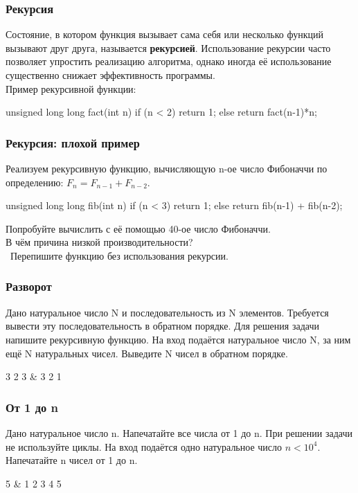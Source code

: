 \begin{frame}[fragile]
	\frametitle{Рекурсия}
	Состояние, в котором функция вызывает сама себя или несколько функций вызывают
	друг друга, называется {\bf рекурсией}. Использование рекурсии часто позволяет
	упростить реализацию алгоритма, однако иногда её использование существенно
	снижает эффективность программы. \\

	Пример рекурсивной функции:
	\begin{code}
unsigned long long fact(int n)
{
	if (n < 2)
		return 1;
	else
		return fact(n-1)*n;
}
	\end{code}
\end{frame}

\begin{frame}[fragile]
	\frametitle{Рекурсия: плохой пример}
	Реализуем рекурсивную функцию, вычисляющую n-ое число Фибоначчи по
	определению: $F_n = F_{n-1} + F_{n-2}$.

	\begin{code}
unsigned long long fib(int n)
{
	if (n < 3)
		return 1;
	else
		return fib(n-1) + fib(n-2);
}
	\end{code}
	Попробуйте вычислить с её помощью 40-ое число Фибоначчи. \\
	В чём причина низкой производительности? \\

	\bigqm \, Перепишите функцию без использования рекурсии.

\end{frame}

\begin{frame}
	\frametitle{Разворот}
	Дано натуральное число N и последовательность из N элементов. Требуется
	вывести эту последовательность в обратном порядке. Для решения задачи напишите
	рекурсивную функцию.
	\inp
	На вход подаётся натуральное число N, за ним ещё N натуральных чисел.
	\out
	Выведите N чисел в обратном порядке.
	\begin{ex}
		3  2 3 & 3 2 1\tb
	\end{ex}
\end{frame}

\begin{frame}
	\frametitle{От 1 до n}
	Дано натуральное число n. Напечатайте все числа от 1 до n. При решении задачи не
	используйте циклы.
	\inp
	На вход подаётся одно натуральное число $n < 10^4$.
	\out
	Напечатайте n чисел от 1 до n.
	\begin{ex}
		5 & 1 2 3 4 5\tb
	\end{ex}
\end{frame}

